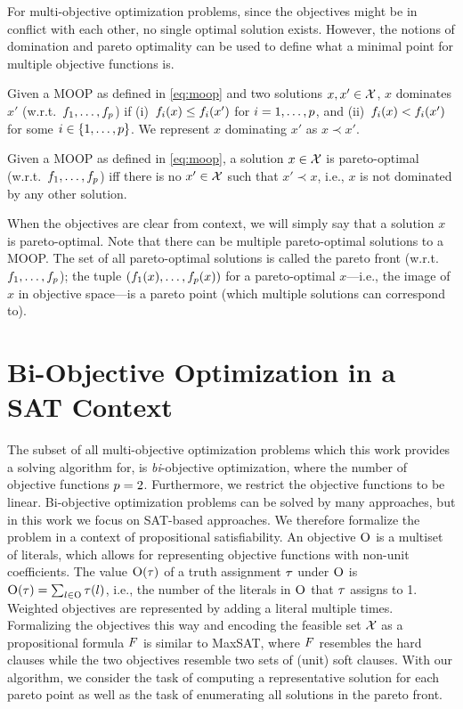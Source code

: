 For multi-objective optimization problems, since the objectives might be in conflict with each other, no single optimal solution exists.
However, the notions of domination and pareto optimality can be used to define what a minimal point for multiple objective functions is.
\begin{definition}
  Given a MOOP as defined in \cref{eq:moop} and two solutions $x,x' \in \mathcal{X}$, $x$ dominates $x'$ (w.r.t.\ $f_1,\dots,f_p$) if (i)~$f_i(x) \leq f_i(x')$ for $i=1,\dots,p$, and (ii)~$f_i(x) < f_i(x')$ for some $i\in\{1,\dots,p\}$.
  We represent $x$ dominating $x'$ as $x \prec x'$.
\end{definition}
\begin{definition}
  Given a MOOP as defined in \cref{eq:moop}, a solution $x \in \mathcal{X}$ is pareto-optimal (w.r.t.\ $f_1,\dots,f_p$) iff there is no $x' \in \mathcal{X}$ such that $x' \prec x$, i.e., $x$ is not dominated by any other solution.
\end{definition}
When the objectives are clear from context, we will simply say that a solution $x$ is pareto-optimal.
Note that there can be multiple pareto-optimal solutions to a MOOP.
The set of all pareto-optimal solutions is called the pareto front (w.r.t.\ $f_1,\dots,f_p$);
the tuple $(f_1(x),\dots,f_p(x))$ for a pareto-optimal $x$---i.e., the image of $x$ in objective space---is a pareto point (which multiple solutions can correspond to).

\section{Bi-Objective Optimization in a SAT Context\label{sec:biopt}}

The subset of all multi-objective optimization problems which this work provides a solving algorithm for, is \emph{bi}-objective optimization, where the number of objective functions $p=2$.
Furthermore, we restrict the objective functions to be linear.
Bi-objective optimization problems can be solved by many approaches, but in this work we focus on SAT-based approaches.
We therefore formalize the problem in a context of propositional satisfiability.
An objective $\textsc{O}$ is a multiset of literals, which allows for representing objective functions with non-unit coefficients.
The value $\textsc{O}(\tau)$ of a truth assignment $\tau$ under $\textsc{O}$ is $\textsc{O}(\tau) = \sum_{l \in \textsc{O}} \tau(l)$, i.e., the number of the literals in $\textsc{O}$ that $\tau$ assigns to 1. 
Weighted objectives are represented by adding a literal multiple times.
Formalizing the objectives this way and encoding the feasible set $\mathcal{X}$ as a propositional formula $F$ is similar to MaxSAT, where $F$ resembles the hard clauses while the two objectives resemble two sets of (unit) soft clauses.
With our algorithm, we consider the task of computing a representative solution for each pareto point as well as the task of enumerating all solutions in the pareto front.

